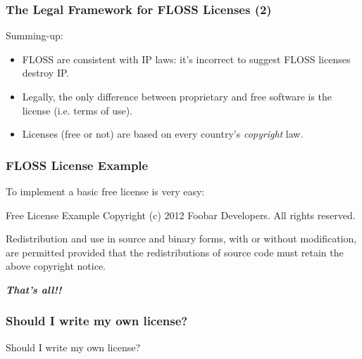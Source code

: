 \documentclass{beamer}
\begin{document}
\begin{frame}
\frametitle{The Legal Framework for FLOSS Licenses (2)}

Summing-up:
\begin{itemize}
\item FLOSS are consistent with IP laws: it's incorrect to suggest FLOSS licenses destroy IP.
\item Legally, the only difference between proprietary and free software is the license (i.e. terms of use). 
\item Licenses (free or not) are based on every country's \textit{copyright} law.
\end{itemize}

\end{frame}



\begin{frame}
\frametitle{FLOSS License Example}

To implement a basic free license is very easy: 

\begin{block}{Free License Example}
Copyright (c) 2012 Foobar Developers. All rights reserved. 

\medskip
Redistribution and use in source and binary forms, with or without modification, are permitted provided that the redistributions of source code must retain the above copyright notice.
\end{block}

\pause
\medskip

\textbf{\textit{That's all!!}}

\end{frame}


\begin{frame}
\frametitle{Should I write my own license?}

\begin{center}
\Large Should I write my own license?
\end{center}

\end{frame}

\end{document}
